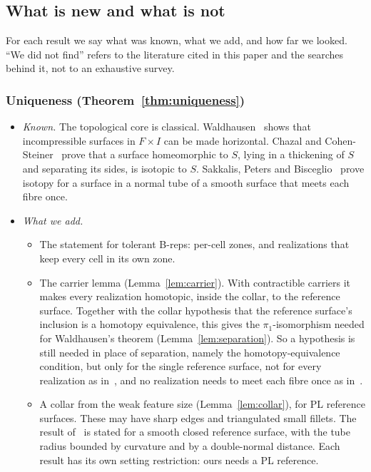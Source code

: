 \documentclass[preprint,12pt]{elsarticle}
\theoremstyle{definition}
\theoremstyle{remark}
\begin{document}
\subsection{What is new and what is not}
For each result we say what was known, what we add, and how far we looked. ``We did not find'' refers to the
literature cited in this paper and the searches behind it, not to an exhaustive survey.

\subsubsection*{Uniqueness (Theorem~\ref{thm:uniqueness})}
\begin{itemize}
\item \emph{Known.} The topological core is classical. Waldhausen~\cite[Prop.~3.1]{Waldhausen68} shows that
incompressible surfaces in $F\times I$ can be made horizontal. Chazal and Cohen-Steiner~\cite[Thm.~2.1]{CCS05} prove
that a surface homeomorphic to $S$, lying in a thickening of $S$ and separating its sides, is isotopic to $S$.
Sakkalis, Peters and Bisceglio~\cite[Thm.~10]{SPB04} prove isotopy for a surface in a normal tube of a smooth surface
that meets each fibre once.
\item \emph{What we add.}
  \begin{itemize}
  \item The statement for tolerant B-reps: per-cell zones, and realizations that keep every cell in its own zone.
  \item The carrier lemma (Lemma~\ref{lem:carrier}). With contractible carriers it makes every realization homotopic,
  inside the collar, to the reference surface. Together with the collar hypothesis that the reference surface's
  inclusion is a homotopy equivalence, this gives the $\pi_1$-isomorphism needed for Waldhausen's theorem
  (Lemma~\ref{lem:separation}). So a hypothesis is still needed in place of separation, namely the homotopy-equivalence
  condition, but only for the single reference surface, not for every realization as in~\cite{CCS05}, and no realization needs to meet each fibre once as
  in~\cite{SPB04}.
  \item A collar from the weak feature size (Lemma~\ref{lem:collar}), for PL reference surfaces. These may have sharp
  edges and triangulated small fillets. The result of~\cite{SPB04} is stated for a smooth closed reference surface, with
  the tube radius bounded by curvature and by a double-normal distance. Each result has its own setting restriction:
  ours needs a PL reference.

\end{itemize}
\end{itemize}
\end{document}
